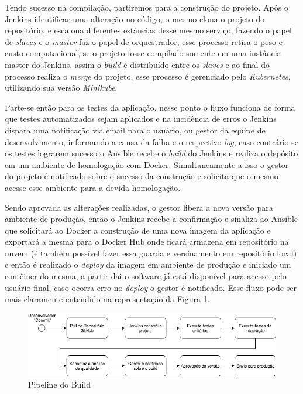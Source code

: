 Tendo sucesso na compilação, partiremos para a construção do projeto. Após o Jenkins identificar uma alteração no código, o mesmo clona o projeto do repositório, e escalona diferentes estâncias desse mesmo serviço, fazendo o papel de \textit{slaves} e o \textit{master} faz o papel de orquestrador, esse processo retira o peso e custo computacional, se o projeto fosse compilado somente em uma instância master do Jenkins, assim o \textit{build} é distribuído entre os \textit{slaves} e ao final do processo realiza o \textit{merge} do projeto, esse processo é gerenciado pelo \textit{Kubernetes}, utilizando sua versão \textit{Minikube}.

Parte-se então para os testes da aplicação, nesse ponto o fluxo funciona de forma que testes automatizados sejam aplicados e na incidência de erros o Jenkins dispara uma notificação via email para o usuário, ou gestor da equipe de desenvolvimento, informando a causa da falha e o respectivo \textit{log}, caso contrário se os testes lograrem sucesso o Ansible recebe o \textit{build} do Jenkins e realiza o depósito em um ambiente de homologação com Docker. Simultaneamente a isso o gestor do projeto é notificado sobre o sucesso da construção e solicita que o mesmo acesse esse ambiente para a devida homologação.

Sendo aprovada as alterações realizadas, o gestor libera a nova versão para ambiente de produção, então o Jenkins recebe a confirmação e sinaliza ao Ansible que solicitará ao Docker a construção de uma nova imagem da aplicação e exportará a mesma para o Docker Hub onde ficará armazena em repositório na nuvem (é também possível fazer essa guarda e versinamento em repositório local) e então é realizado o \textit{deploy} da imagem em ambiente de produção e iniciado um contêiner do mesma, a partir dai o software já está disponível para acesso pelo usuário final, caso ocorra erro no \textit{deploy} o gestor é notificado. Esse fluxo pode ser mais claramente entendido na representação da Figura \ref{fig:pipelinebuild}.

\begin{figure}[htb]
	\centering
	\includegraphics[width=1\linewidth]{imagens/pipelinebuild}
	\caption{Pipeline do Build}
	\label{fig:pipelinebuild}
\end{figure}


